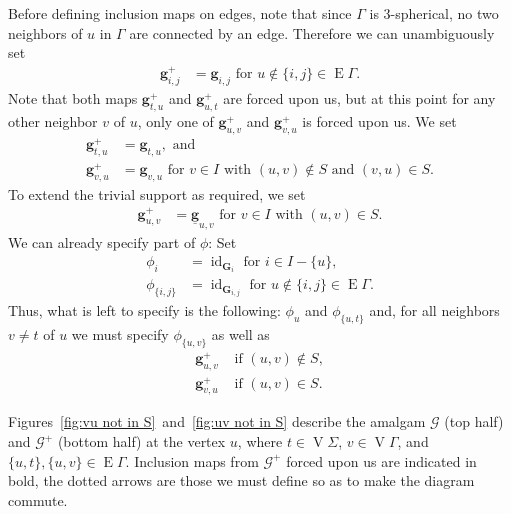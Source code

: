 \documentclass[12pt]{amsart}
\theoremstyle{definition}
\newcommand{\ul}{\underline}
\DeclareMathOperator{\id}{id}
\newcommand{\amgrpG}{{\mathbf{G}}}
\newcommand{\amg}{{\mathbf g}}
\newcommand{\famg}{\ul{\mathbf g}}
\newcommand{\amG}{{\mathscr{G}}}
\DeclareMathOperator{\edg}{E}
\DeclareMathOperator{\vrtc}{V}
\newcommand{\liediag}{\Gamma}
\begin{document}
Before defining inclusion maps on edges, note that since $\liediag$ is $3$-spherical, no two neighbors of $u$ in $\Gamma$ are connected by an edge.
Therefore we can unambiguously set 
\begin{align*}
\amg^+_{i,j} & = \amg_{i,j}  \mbox{ for }u\not\in\{i,j\}\in \edg\liediag. 
\end{align*} 
Note that both maps $\amg^+_{t,u}$ and $\amg^+_{u,t}$ are forced upon us, but at  this point for any other neighbor $v$ of $u$, only one of $\amg^+_{u,v}$ and $\amg^+_{v,u}$ is forced upon us. 
We set 
\begin{align*}
\amg^+_{t,u}&=\amg_{t,u}, \mbox{ and }\\
\amg^+_{v,u}&=\amg_{v,u} \mbox{ for }v\in I \mbox{ with }(u,v)\not\in S \mbox{ and }(v,u)\in S.
\end{align*}
To extend the trivial support as required, we set 
\begin{align*}
\amg^+_{u,v}&=\famg_{u,v} \mbox{ for }v\in I \mbox{ with }(u,v)\in S.
\end{align*}
We can already specify part of $\phi$: Set
\begin{align*}
\phi_i& =\id_{\amgrpG_i} \mbox{ for }i\in I-\{u\},\\
\phi_{\{i,j\}}&=\id_{\amgrpG_{i,j}} \mbox{ for } u\not\in \{i,j\}\in \edg\liediag.
\end{align*}
Thus, what is left to specify is the following: $\phi_u$ and $\phi_{\{u,t\}}$ and, for all neighbors $v\ne t$ of $u$ we must specify $\phi_{\{u,v\}}$ as well as  
\begin{align*}
\amg^+_{u,v} & \mbox{ if  } (u,v)\not\in S,\\
\amg^+_{v,u} & \mbox{ if }  (u,v)\in S.
\end{align*}  

Figures~\ref{fig:vu not in S}~and~\ref{fig:uv not in S} describe the amalgam $\amG$ (top half) and $\amG^+$ (bottom half) at the vertex $u$, where $t\in \vrtc \Sigma$, $v\in \vrtc \liediag$, and $\{u,t\}, \{u,v\}\in \edg\liediag$.
Inclusion maps from $\amG^+$ forced upon us are indicated in bold, the dotted arrows are those we must define so as to make the diagram commute.
\end{document}
